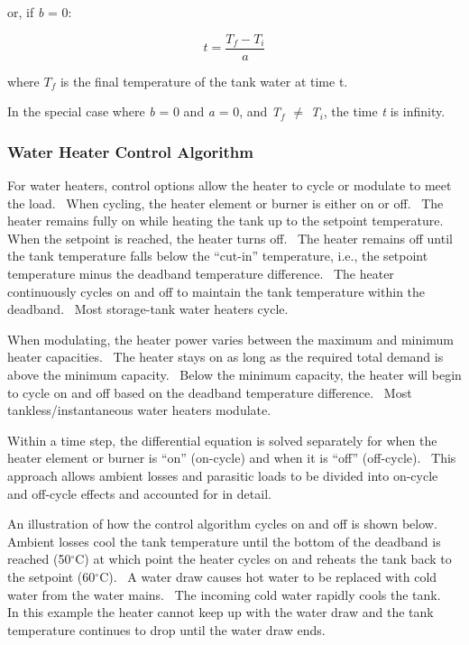 or, if \emph{b} = 0:

\begin{equation}
t = \frac{{{T_f} - {T_i}}}{a}
\end{equation}

where \(T_{f}\) is the final temperature of the tank water at time t.

In the special case where \emph{b} = 0 and \emph{a} = 0, and \emph{T\(_{f}\)} \(\neq\) \emph{T\(_{i}\)}, the time \emph{t} is infinity.

\subsubsection{Water Heater Control Algorithm}\label{water-heater-control-algorithm}

For water heaters, control options allow the heater to cycle or modulate to meet the load.~ When cycling, the heater element or burner is either on or off.~ The heater remains fully on while heating the tank up to the setpoint temperature.~ When the setpoint is reached, the heater turns off.~ The heater remains off until the tank temperature falls below the ``cut-in'' temperature, i.e., the setpoint temperature minus the deadband temperature difference.~ The heater continuously cycles on and off to maintain the tank temperature within the deadband.~ Most storage-tank water heaters cycle.

When modulating, the heater power varies between the maximum and minimum heater capacities.~ The heater stays on as long as the required total demand is above the minimum capacity.~ Below the minimum capacity, the heater will begin to cycle on and off based on the deadband temperature difference.~ Most tankless/instantaneous water heaters modulate.

Within a time step, the differential equation is solved separately for when the heater element or burner is ``on'' (on-cycle) and when it is ``off'' (off-cycle).~ This approach allows ambient losses and parasitic loads to be divided into on-cycle and off-cycle effects and accounted for in detail.

An illustration of how the control algorithm cycles on and off is shown below.~ Ambient losses cool the tank temperature until the bottom of the deadband is reached (50\(^{\circ}\)C) at which point the heater cycles on and reheats the tank back to the setpoint (60\(^{\circ}\)C).~ A water draw causes hot water to be replaced with cold water from the water mains.~ The incoming cold water rapidly cools the tank.~ In this example the heater cannot keep up with the water draw and the tank temperature continues to drop until the water draw ends.

